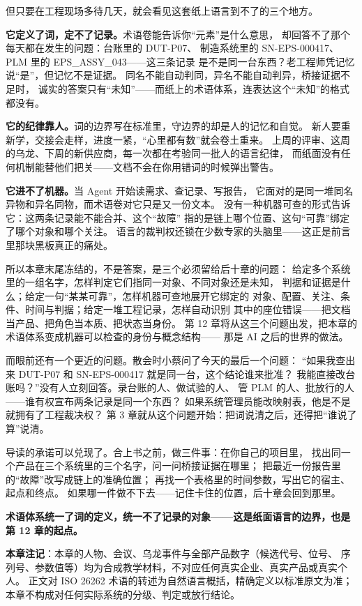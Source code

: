 但只要在工程现场多待几天，就会看见这套纸上语言到不了的三个地方。

\textbf{它定义了词，定不了记录。}术语卷能告诉你“元素”是什么意思，
却回答不了那个每天都在发生的问题：台账里的 DUT-P07、
制造系统里的 SN-EPS-000417、PLM 里的 EPS\_ASSY\_043——这三条记录
是不是同一台东西？老工程师凭记忆说“是”，但记忆不是证据。
同名不能自动判同，异名不能自动判异，桥接证据不足时，
诚实的答案只有“未知”——而纸上的术语体系，连表达这个“未知”的格式都没有。

\textbf{它的纪律靠人。}词的边界写在标准里，守边界的却是人的记忆和自觉。
新人要重新学，交接会走样，进度一紧，“心里都有数”就会卷土重来。
上周的评审、这周的乌龙、下周的新供应商，每一次都在考验同一批人的语言纪律，
而纸面没有任何机制能替他们把关——文档不会在你用错词的时候弹出警告。

\textbf{它进不了机器。}当 Agent 开始读需求、查记录、写报告，
它面对的是同一堆同名异物和异名同物，而术语卷对它只是又一份文本。
没有一种机器可查的形式告诉它：这两条记录能不能合并、这个“故障”
指的是链上哪个位置、这句“可靠”绑定了哪个对象和哪个关注。
语言的裁判权还锁在少数专家的头脑里——这正是前言里那块黑板真正的痛处。

所以本章末尾冻结的，不是答案，是三个必须留给后十章的问题：
给定多个系统里的一组名字，怎样判定它们指同一对象、不同对象还是未知，
判据和证据是什么；给定一句“某某可靠”，怎样机器可查地展开它绑定的
对象、配置、关注、条件、时间与判据；给定一堆工程记录，怎样自动识别
其中的座位错误——把文档当产品、把角色当本质、把状态当身份。
第 12 章将从这三个问题出发，把本章的术语体系变成机器可以检查的身份与概念结构——
那是 AI 之后的世界的做法。

而眼前还有一个更近的问题。散会时小蔡问了今天的最后一个问题：
“如果我查出来 DUT-P07 和 SN-EPS-000417 就是同一台，这个结论谁来批准？
我能直接改台账吗？”没有人立刻回答。录台账的人、做试验的人、
管 PLM 的人、批放行的人——谁有权宣布两条记录是同一个东西？
如果系统管理员能改映射表，他是不是就拥有了工程裁决权？
第 3 章就从这个问题开始：把词说清之后，还得把“谁说了算”说清。

导读的承诺可以兑现了。合上书之前，做三件事：在你自己的项目里，
找出同一个产品在三个系统里的三个名字，问一问桥接证据在哪里；
把最近一份报告里的“故障”改写成链上的准确位置；
再找一个表格里的时间参数，写出它的宿主、起点和终点。
如果哪一件做不下去——记住卡住的位置，后十章会回到那里。

\textbf{术语体系统一了词的定义，统一不了记录的对象——这是纸面语言的边界，也是第 12 章的起点。}


\begin{noteblock}
\textbf{本章注记}：本章的人物、会议、乌龙事件与全部产品数字（候选代号、位号、
序列号、参数值等）均为合成教学材料，不对应任何真实企业、真实产品或真实个人。
正文对 ISO 26262 术语的转述为自然语言概括，精确定义以标准原文为准；
本章不构成对任何实际系统的分级、判定或放行结论。
\end{noteblock}
